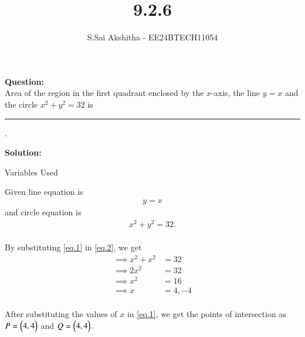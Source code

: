 \documentclass[journal,12pt,onecolumn]{IEEEtran}
\theoremstyle{remark}
\begin{document}

\vspace{3cm}

\title{9.2.6 }
\author{S.Sai Akshitha - EE24BTECH11054}
\newpage
\maketitle
\bigskip

\renewcommand{\thefigure}{\theenumi}
\renewcommand{\thetable}{\theenumi}

\textbf{Question:} \\ Area of the region in the first quadrant enclosed by the $x$-axis, the line $y=x$ and the circle $x^2+y^2=32$ is \rule{1cm}{0.15mm}.  

\textbf{Solution:}
\begin{table}[ht!]    
  \centering
  
  
  \caption{Variables Used}
\end{table}

 Given line equation is 
 \begin{align}
    y=x
    \label{eq.1}
 \end{align} and circle equation is 
 \begin{align}
     x^2+y^2=32. \label{eq.2}
 \end{align} \\ By substituting \ref{eq.1} in \ref{eq.2}, we get \\ 
\begin{align*}
     \implies x^2+x^2&=32\\
 \implies 2x^2&=32\\
 \implies x^2&=16\\
 \implies x&=4,-4\\
\end{align*}
 
 After substituting the values of $x$ in \ref{eq.1}, we get the points of intersection as $P=\begin{pmatrix}4,4\end{pmatrix}$ and $Q=\begin{pmatrix}4,4\end{pmatrix}.$ 
\end{document}
